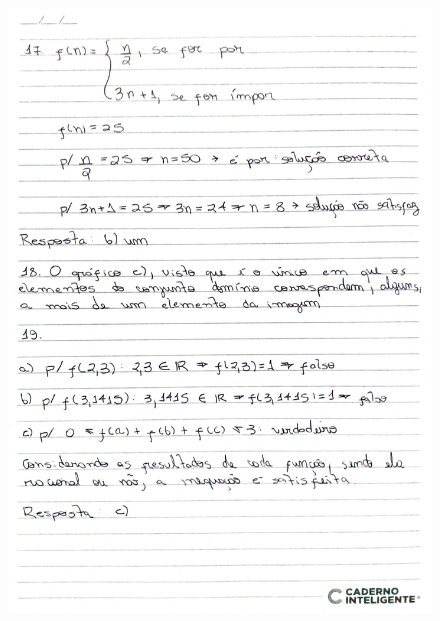 \documentclass[
  12pt,     %
  openright,      %
  oneside,      %
  a4paper     %
  ]{abntex2}
\begin{document}
\begin{figure}[H]
  \centering
  \includegraphics[scale=0.23]{pagina9.jpg}
\end{figure}
\end{document}
